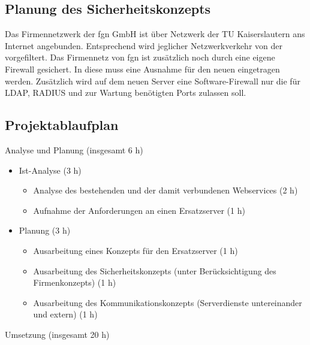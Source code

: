 \documentclass[11pt,a4paper,titlepage=firstiscover]{scrartcl} %
\begin{document}
\subsection{Planung des Sicherheitskonzepts}\label{sec:Sicherheitskonzept}
Das Firmennetzwerk der fgn GmbH ist über  Netzwerk der TU 
Kaiserslautern ans Internet angebunden. Entsprechend wird jeglicher 
Netzwerkverkehr von der  vorgefiltert. Das Firmennetz von fgn 
ist zusätzlich noch durch eine eigene Firewall gesichert. In diese muss 
 eine Ausnahme für den neuen  
eingetragen werden. Zusätzlich wird auf dem neuen Server eine Software-Firewall 
 nur die für LDAP, RADIUS und zur Wartung benötigten Ports 
zulassen soll.

\subsection{Projektablaufplan}
Analyse und Planung (insgesamt 6 h)
	\begin{itemize}
	\item Ist-Analyse (3 h)
		\begin{itemize}
		\item Analyse des bestehenden  und der damit 
				verbundenen Webservices (2 h)
		\item Aufnahme der Anforderungen an einen Ersatzserver (1 h)
		\end{itemize}
	\item Planung (3 h)
		\begin{itemize}
		\item Ausarbeitung eines Konzepts für den Ersatzserver (1 h)
		\item Ausarbeitung des Sicherheitskonzepts (unter Berücksichtigung des 
				Firmenkonzepts) (1 h)
		\item Ausarbeitung des Kommunikationskonzepts (Serverdienste untereinander 
				und extern) (1 h)
		\end{itemize}
	\end{itemize}
Umsetzung (insgesamt 20 h)
\end{document}
